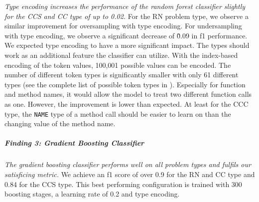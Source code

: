 \textit{Type encoding increases the performance of the random forest classifier slightly for the CCS and CC type of up to 0.02.} For the RN problem type, we observe a similar improvement for oversampling with type encoding. For undersampling with type encoding, we observe a significant decrease of \~0.09 in f1 performance. 
We expected type encoding to have a more significant impact. The types should work as an additional feature the classifier can utilize. With the index-based encoding of the token values, 100,001 possible values can be encoded. The number of different token types is significantly smaller with only 61 different types (see the complete list of possible token types in ). Especially for function and method names, it would allow the model to treat two different function calls as one. 
However, the improvement is lower than expected. At least for the CCC type, the \texttt{NAME} type of a method call should be easier to learn on than the changing value of the method name.  

\begin{center}
\end{center}

\subparagraph{Finding 3: Gradient Boosting Classifier}\label{finding:rq2_gbc}
\textit{The gradient boosting classifier performs well on all problem types and fulfils our satisficing metric.} We achieve an f1 score of over 0.9 for the RN and CC type and 0.84 for the CCS type. This best performing configuration is trained with 300 boosting stages, a learning rate of 0.2 and type encoding.


